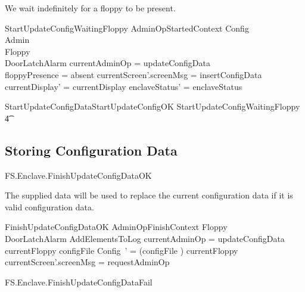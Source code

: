 We wait indefinitely for a floppy to be present.

\begin{schema}{StartUpdateConfigWaitingFloppy}
        AdminOpStartedContext
\also   
        \Xi Config
\\      \Xi Admin 
\\      \Xi Floppy    
\\      \Xi DoorLatchAlarm
\where
        \The currentAdminOp = updateConfigData
\\      floppyPresence = absent
\also
        currentScreen'.screenMsg = insertConfigData
\\      currentDisplay' = currentDisplay
\also
        enclaveStatus' = enclaveStatus
\end{schema}

\begin{zed}
        StartUpdateConfigData StartUpdateConfigOK  
         \lor StartUpdateConfigWaitingFloppy
\\ \t4  \lor
        [~ BadAdminLogout | enclaveStatus = waitingStartAdminOp 
\\ \t6  \land \The currentAdminOp = updateConfigData      ~]
\end{zed}

\subsection{Storing Configuration Data}

\begin{traceunit}{FS.Enclave.FinishUpdateConfigDataOK}
\end{traceunit}


The supplied data will be used to replace the current configuration data
if it is valid configuration data.

\begin{schema}{FinishUpdateConfigDataOK}
        AdminOpFinishContext
\also
        \Xi Floppy
\\      \Xi DoorLatchAlarm
\also
        AddElementsToLog
\where
        \The currentAdminOp = updateConfigData
\also        
        currentFloppy \in \ran configFile
\also
        \theta Config~' = (configFile \inv) currentFloppy
\also
        currentScreen'.screenMsg = requestAdminOp
\end{schema}

\begin{traceunit}{FS.Enclave.FinishUpdateConfigDataFail}
\end{traceunit}


